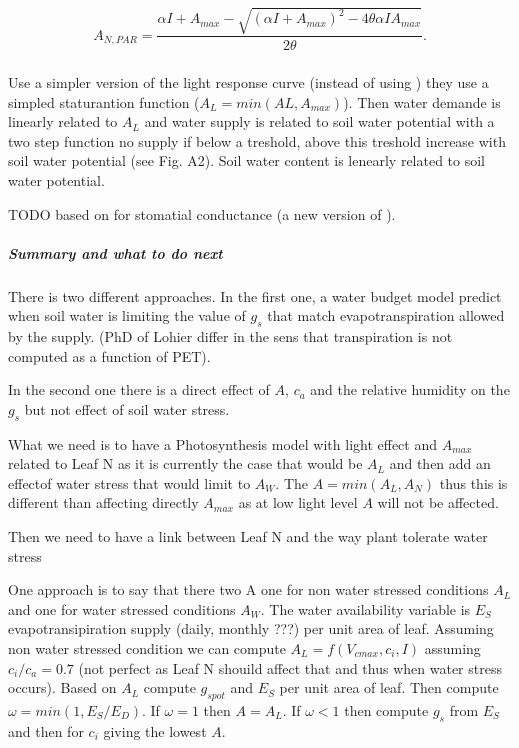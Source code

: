 \documentclass[a4paper,11pt]{article}
\begin{document}
\begin{equation}
\label{eq:Johnson}
A_{N,PAR} = \frac{ \alpha I + A_{max} - \sqrt{(\alpha I + A_{max})^2 - 4 \theta \alpha I A_{max}}}{2\theta}.
\end{equation}

\subparagraph{\citet{Farrior-2013}}

Use a simpler version of the light response curve (instead of using
\citet{Johnson-1984}) they use a simpled staturantion function
($A_L = min(AL, A_{max})$). Then water demande is linearly related to
$A_L$ and water supply is related to soil water potential with a two
step function no supply if below a treshold, above this treshold
increase with soil water potential (see Fig. A2). Soil water content
is lenearly related to soil water potential.

TODO \citet{Zavala-2005} based on \citet{leuning-1995} for stomatial
conductance (a new version of \citet{Collatz-1991}).

\subparagraph{Summary and what to do next}

There is two different approaches. In the first one, a water budget model
predict when soil water is limiting the value of $g_s$ that match
evapotranspiration allowed by the supply. (PhD of Lohier differ in the
sens that transpiration is not computed as a function of PET).

In the second one there is a direct effect of $A$, $c_a$ and the
relative humidity on the $g_s$ but not effect of soil water stress.

What we need is to have a Photosynthesis model with light effect and
$A_{max}$ related to Leaf N as it is currently the case that would be
$A_L$ and then add an effectof water stress that would limit to
$A_W$. The $A = min(A_L , A_N)$ thus this is different than affecting
directly $A_{max}$ as at low light level $A$ will not be affected.

Then we need to have a link between Leaf N and the way plant tolerate
water stress


One approach is to say that there two A one for non water stressed
conditions $A_L$ and one for water stressed conditions $A_W$. The
water availability variable is $E_S$ evapotransipiration supply
(daily, monthly ???) per unit area of leaf. Assuming non water
stressed condition we can
compute $A_L = f(V_{cmax}, c_i, I)$ assuming $c_i/c_a = 0.7$ (not
perfect as Leaf N shouild affect that and thus when water stress
occurs). Based on $A_L$ compute $g_{s pot}$ and $E_S$ per unit area of
leaf. Then compute $\omega = min(1, E_S/E_D)$. If $\omega = 1$ then $A
= A_L$. If $\omega < 1$ then compute $g_s$ from $E_S$ and then for
$c_i$ giving the lowest $A$.
\end{document}
